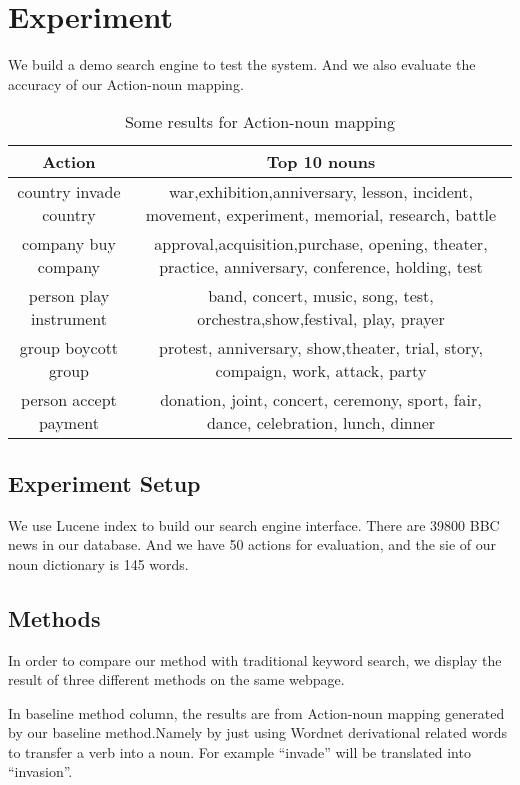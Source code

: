 \section{Experiment}
We build a demo search engine to test the system. And we also evaluate the accuracy of
our Action-noun mapping.
\begin{table*}[th]
    \centering
    \caption{ Some results for Action-noun mapping }
    \begin{tabular} {c|c}
        \hline
        Action & Top 10 nouns\\
        \hline
        country invade country & \parbox[t]{12cm}{ war,exhibition,anniversary, lesson, incident, movement, experiment, memorial, research, battle}\\
        \hline
        company buy company & \parbox[t]{12cm} { approval,acquisition,purchase, opening, theater, practice, anniversary, conference, holding, test}\\
        \hline
        person play instrument & \parbox[t]{12cm} {band, concert, music, song, test, orchestra,show,festival, play, prayer}\\
        \hline
        group boycott group & \parbox[t]{12cm} {protest, anniversary, show,theater, trial, story, compaign, work, attack, party}\\
        \hline
        person accept payment & \parbox[t]{12cm} {donation, joint, concert, ceremony, sport, fair, dance, celebration, lunch, dinner}\\
        \hline
    \end{tabular}
\end{table*}
\subsection{Experiment Setup}
We use Lucene index to build our search engine interface. There are 39800 BBC news in our
database. And we have 50 actions for evaluation, and the sie of our noun dictionary is
145 words.
\subsection{Methods}
In order to compare our method with traditional keyword search,
we display the result of three different methods on the same webpage.


In baseline method column, the results are from Action-noun mapping
generated by our baseline method.Namely by just using Wordnet derivational
 related words to transfer a verb into a noun.
For example ``invade'' will be translated into ``invasion''.


